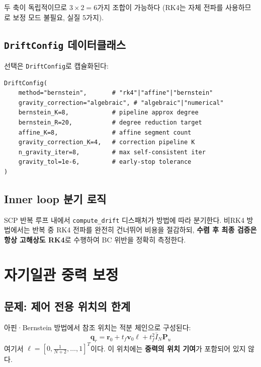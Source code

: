 \documentclass[11pt]{article}
\begin{document}
두 축이 독립적이므로 $3 \times 2 = 6$가지 조합이 가능하다
(RK4는 자체 전파를 사용하므로 보정 모드 불필요, 실질 5가지).

\subsection{\texttt{DriftConfig} 데이터클래스}

선택은 \texttt{DriftConfig}로 캡슐화된다:

\begin{lstlisting}[style=pythonstyle]
DriftConfig(
    method="bernstein",       # "rk4"|"affine"|"bernstein"
    gravity_correction="algebraic", # "algebraic"|"numerical"
    bernstein_K=8,            # pipeline approx degree
    bernstein_R=20,           # degree reduction target
    affine_K=8,               # affine segment count
    gravity_correction_K=4,   # correction pipeline K
    n_gravity_iter=8,         # max self-consistent iter
    gravity_tol=1e-6,         # early-stop tolerance
)
\end{lstlisting}

\subsection{Inner loop 분기 로직}

SCP 반복 루프 내에서 \texttt{compute\_drift} 디스패처가 방법에 따라 분기한다.
비RK4 방법에서는 반복 중 RK4 전파를 완전히 건너뛰어 비용을 절감하되,
\textbf{수렴 후 최종 검증은 항상 고해상도 RK4}로 수행하여 BC 위반을
정확히 측정한다.


\section{자기일관 중력 보정}
\label{sec:selfconsistent}

\subsection{문제: 제어 전용 위치의 한계}

아핀·Bernstein 방법에서 참조 위치는 적분 체인으로 구성된다:
\begin{equation}
  \mathbf{q}_r = \mathbf{r}_0 + t_f \mathbf{v}_0 \boldsymbol{\ell}
               + t_f^2 \bar{I}_N \mathbf{P}_u
  \label{eq:qr_control}
\end{equation}
여기서 $\boldsymbol{\ell} = [0, \frac{1}{N+2}, \ldots, 1]^T$이다.
이 위치에는 \textbf{중력의 위치 기여}가 포함되어 있지 않다.
\end{document}
